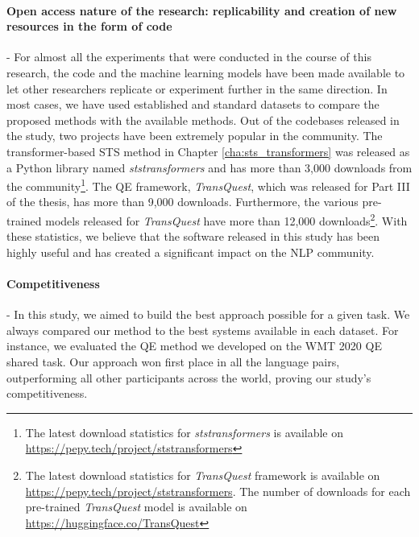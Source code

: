 \paragraph{Open access nature of the research: replicability and creation of new resources in the form of code} - For almost all the experiments that were conducted in the course of this research, the code and the machine learning models have been made available to let other researchers replicate or experiment further in the same direction. In most cases, we have used established and standard datasets to compare the proposed methods with the available methods. Out of the codebases released in the study, two projects have been extremely popular in the community. The transformer-based STS method in Chapter \ref{cha:sts_transformers} was released as a Python library named \textit{ststransformers} and has more than 3,000 downloads from the community\footnote{The latest download statistics for \textit{ststransformers} is available on \url{https://pepy.tech/project/ststransformers}}. The QE framework, \textit{TransQuest}, which was released for Part III of the thesis, has more than 9,000 downloads. Furthermore, the various pre-trained models released for \textit{TransQuest} have more than 12,000 downloads\footnote{The latest download statistics for \textit{TransQuest} framework is available on \url{https://pepy.tech/project/ststransformers}. The number of downloads for each pre-trained \textit{TransQuest} model is available on \url{https://huggingface.co/TransQuest}}. With these statistics, we believe that the software released in this study has been highly useful and has created a significant impact on the NLP community.

\paragraph{Competitiveness} - In this study, we aimed to build the best approach possible for a given task. We always compared our method to the best systems available in each dataset. For instance, we evaluated the QE method we developed on the WMT 2020 QE shared task. Our approach won first place in all the language pairs, outperforming all other participants across the world, proving our study's competitiveness.



